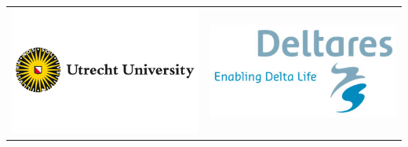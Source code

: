 \begin{table}
\begin{tabular}{cc}
        \includegraphics[width = 2.5in]{figures/utrechtlogo.png} &
        \includegraphics[width = 2.5in]{figures/deltareslogo.jpg}\\
    \end{tabular}
\end{table}
